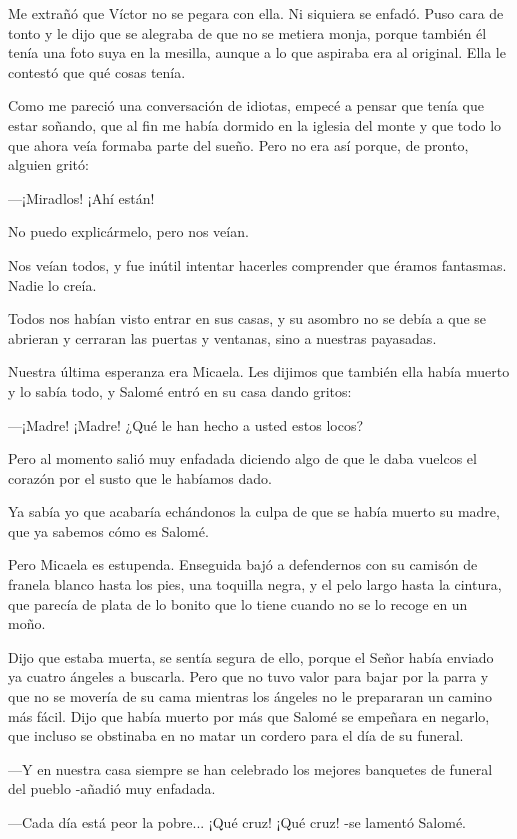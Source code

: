 \documentclass{barcodevapor3pags}
\begin{document}
Me extrañó que Víctor no se pegara con ella. Ni siquiera se enfadó. Puso
cara de tonto y le dijo que se alegraba de que no se metiera monja,
porque también él tenía una foto suya en la mesilla, aunque a lo que
aspiraba era al original. Ella le contestó que qué cosas tenía.~

Como me pareció una conversación de idiotas, empecé a pensar que tenía
que estar soñando, que al fin me había dormido en la iglesia del monte y
que todo lo que ahora veía formaba parte del sueño. Pero no era así
porque, de pronto, alguien gritó:~

---¡Miradlos! ¡Ahí están!


\capitulo
{\Large N}o puedo explicármelo, pero nos veían.

Nos veían todos, y fue inútil intentar hacerles comprender que éramos
fantasmas. Nadie lo creía.~

Todos nos habían visto entrar en sus casas, y su asombro no se debía a
que se abrieran y cerraran las puertas y ventanas, sino a nuestras
payasadas.~

Nuestra última esperanza era Micaela. Les dijimos que también ella había
muerto y lo sabía todo, y Salomé entró en su casa dando gritos:~

---¡Madre! ¡Madre! ¿Qué le han hecho a usted estos locos?~

Pero al momento salió muy enfadada diciendo algo de que le daba vuelcos
el corazón por el susto que le habíamos dado.~

Ya sabía yo que acabaría echándonos la culpa de que se había muerto su
madre, que ya sabemos cómo es Salomé.~

Pero Micaela es estupenda. Enseguida bajó a defendernos con su camisón
de franela blanco hasta los pies, una toquilla negra, y el pelo largo
hasta la cintura, que parecía de plata de lo bonito que lo tiene cuando
no se lo recoge en un moño.~

Dijo que estaba muerta, se sentía segura de ello, porque el Señor había
enviado ya cuatro ángeles a buscarla. Pero que no tuvo valor para bajar
por la parra y que no se movería de su cama mientras los ángeles no le
prepararan un camino más fácil. Dijo que había muerto por más que Salomé
se empeñara en negarlo, que incluso se obstinaba en no matar un cordero
para el día de su funeral.~

---Y en nuestra casa siempre se han celebrado los mejores banquetes de
funeral del pueblo -añadió muy enfadada.~

---Cada día está peor la pobre... ¡Qué cruz! ¡Qué cruz! -se lamentó
Salomé.~
\end{document}
